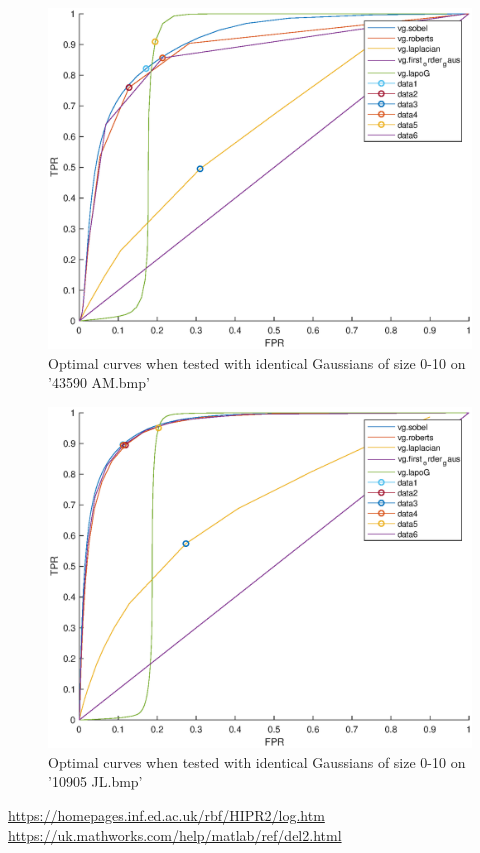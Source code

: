 \documentclass{Resources/UoBLab1}
\begin{document}
\begin{figure}[h]
    \centering
    \includegraphics[scale=0.4]{Resources/images/best2.eps}
    \caption{Optimal curves when tested with identical Gaussians of size 0-10 on '43590 AM.bmp'}
    \label{fig:img2}
\end{figure}
\begin{figure}[h]
    \centering
    \includegraphics[scale=0.4]{Resources/images/best3.eps}
   \caption{Optimal curves when tested with identical Gaussians of size 0-10 on '10905 JL.bmp'}
    \label{fig:img3}
\end{figure}

\begin{thebibliography}{}

    \url{https://homepages.inf.ed.ac.uk/rbf/HIPR2/log.htm}
    \url{https://uk.mathworks.com/help/matlab/ref/del2.html}
\end{thebibliography}
\end{document}
